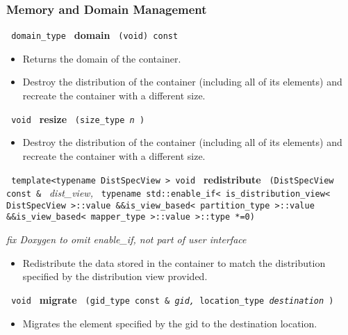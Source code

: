  
\subsubsection{Memory and Domain Management}

\noindent
\texttt{%
domain\_type 	
}
\textbf{domain}%
\texttt{%
(void) const
}

\begin{itemize}
\item
Returns the domain of the container.
\end{itemize}
 
\begin{itemize}
\item
Destroy the distribution of the container (including all of its elements) and recreate the container with a different size. 
\end{itemize}
 
\noindent
\texttt{%
void 
}
\textbf{resize}%
\texttt{%
(size\_type 
\textit{n}%
)
}

\begin{itemize}
\item
Destroy the distribution of the container (including all of its elements) and recreate the container with a different size. 
\end{itemize}
 
\noindent
\texttt{%
template<typename DistSpecView >
void
}
\textbf{redistribute}%
\texttt{%
(DistSpecView const \&
}
\textit{dist\_view,}
\texttt{
typename std::enable\_if< is\_distribution\_view< DistSpecView >::value \&\&is\_view\_based< partition\_type >::value \&\&is\_view\_based< mapper\_type >::value >::type *=0)
}

\vspace{0.4cm} \emph{fix Doxygen to omit enable\_if, not part of user interface}

\begin{itemize}
\item
Redistribute the data stored in the container to match the distribution specified by the distribution view provided. 
\end{itemize}
 
\noindent
\texttt{%
void
}
\textbf{migrate}%
\texttt{%
(gid\_type const \&
\textit{gid,}
location\_type 
\textit{destination}
)
}

\begin{itemize}
\item
Migrates the element specified by the gid to the destination location. 
\end{itemize}
 
